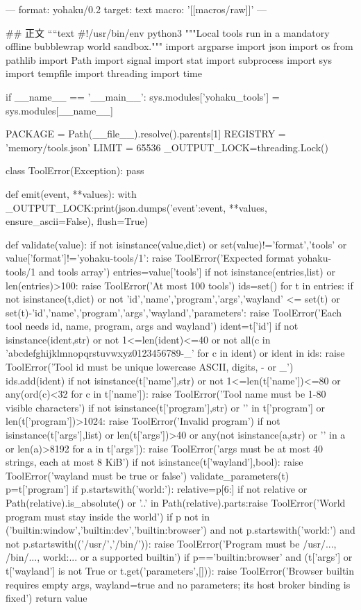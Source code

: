 ---
format: yohaku/0.2
target: text
macro: '[[macros/raw]]'
---

## 正文
````text
#!/usr/bin/env python3
"""Local tools run in a mandatory offline bubblewrap world sandbox."""
import argparse
import json
import os
from pathlib import Path
import signal
import stat
import subprocess
import sys
import tempfile
import threading
import time

if __name__ == '__main__':
    sys.modules['yohaku_tools'] = sys.modules[__name__]

PACKAGE = Path(__file__).resolve().parents[1]
REGISTRY = 'memory/tools.json'
LIMIT = 65536
_OUTPUT_LOCK=threading.Lock()

class ToolError(Exception):
    pass

def emit(event, **values):
    with _OUTPUT_LOCK:print(json.dumps({'event':event, **values}, ensure_ascii=False), flush=True)

def validate(value):
    if not isinstance(value,dict) or set(value)!={'format','tools'} or value['format']!='yohaku-tools/1':
        raise ToolError('Expected format yohaku-tools/1 and tools array')
    entries=value['tools']
    if not isinstance(entries,list) or len(entries)>100:
        raise ToolError('At most 100 tools')
    ids=set()
    for t in entries:
        if not isinstance(t,dict) or not {'id','name','program','args','wayland'} <= set(t) or set(t)-{'id','name','program','args','wayland','parameters'}:
            raise ToolError('Each tool needs id, name, program, args and wayland')
        ident=t['id']
        if not isinstance(ident,str) or not 1<=len(ident)<=40 or not all(c in 'abcdefghijklmnopqrstuvwxyz0123456789-_' for c in ident) or ident in ids:
            raise ToolError('Tool id must be unique lowercase ASCII, digits, - or _')
        ids.add(ident)
        if not isinstance(t['name'],str) or not 1<=len(t['name'])<=80 or any(ord(c)<32 for c in t['name']):
            raise ToolError('Tool name must be 1-80 visible characters')
        if not isinstance(t['program'],str) or '\0' in t['program'] or len(t['program'])>1024:
            raise ToolError('Invalid program')
        if not isinstance(t['args'],list) or len(t['args'])>40 or any(not isinstance(a,str) or '\0' in a or len(a)>8192 for a in t['args']):
            raise ToolError('args must be at most 40 strings, each at most 8 KiB')
        if not isinstance(t['wayland'],bool):
            raise ToolError('wayland must be true or false')
        validate_parameters(t)
        p=t['program']
        if p.startswith('world:'):
            relative=p[6:]
            if not relative or Path(relative).is_absolute() or '..' in Path(relative).parts:raise ToolError('World program must stay inside the world')
        if p not in ('builtin:window','builtin:dev','builtin:browser') and not p.startswith('world:') and not p.startswith(('/usr/','/bin/')):
            raise ToolError('Program must be /usr/..., /bin/..., world:... or a supported builtin')
        if p=='builtin:browser' and (t['args'] or t['wayland'] is not True or t.get('parameters',[])):
            raise ToolError('Browser builtin requires empty args, wayland=true and no parameters; its host broker binding is fixed')
    return value

